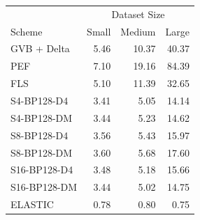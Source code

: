\begin{tabular}{lrrr}
\toprule
 & \multicolumn{3}{c}{Dataset Size} \\
Scheme & Small & Medium & Large \\
\midrule
GVB + Delta & 5.46 & 10.37 & 40.37 \\
PEF & 7.10 & 19.16 & 84.39 \\
FLS & 5.10 & 11.39 & 32.65 \\
S4-BP128-D4 & 3.41 & 5.05 & 14.14 \\
S4-BP128-DM & 3.44 & 5.23 & 14.62 \\
S8-BP128-D4 & 3.56 & 5.43 & 15.97 \\
S8-BP128-DM & 3.60 & 5.68 & 17.60 \\
S16-BP128-D4 & 3.48 & 5.18 & 15.66 \\
S16-BP128-DM & 3.44 & 5.02 & 14.75 \\
ELASTIC & 0.78 & 0.80 & 0.75 \\
\bottomrule
\end{tabular}
